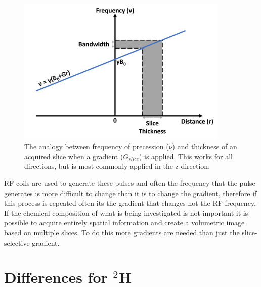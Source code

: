 \documentclass[class=article, crop=false]{standalone}
\begin{document}
\begin{figure}
    \centering
    \includegraphics[width=0.9\textwidth]{Figures/Theory/Gradient.png}
    \caption{The analogy between frequency of precession ($\nu$) and thickness of an acquired slice when a gradient ($G_{slice}$) is applied. This works for all directions, but is most commonly applied in the z-direction.}
    \label{fig:theory:Grad}
\end{figure}

RF coils are used to generate these pulses and often the frequency that the pulse generates is more difficult to change than it is to change the gradient, therefore if this process is repeated often its the gradient that changes not the RF frequency. If the chemical composition of what is being investigated is not important it is possible to acquire entirely spatial information and create a volumetric image based on multiple slices. To do this more gradients are needed than just the slice-selective gradient\cite{deGraaf2019InSpectroscopy}.

\section{Differences for $^2$H}
\end{document}
